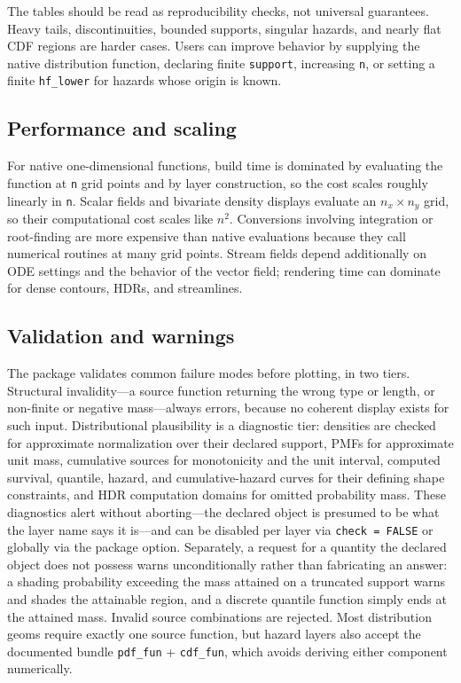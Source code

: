 The tables should be read as reproducibility checks, not universal guarantees.
Heavy tails, discontinuities, bounded supports, singular hazards, and nearly
flat CDF regions are harder cases. Users can improve behavior by supplying the
native distribution function, declaring finite \texttt{support}, increasing
\texttt{n}, or setting a finite \texttt{hf\_lower} for hazards whose origin is known.

\subsection{Performance and scaling}\label{performance-and-scaling}

For native one-dimensional functions, build time is dominated by evaluating the
function at \texttt{n} grid points and by  layer construction, so
the cost scales roughly linearly in \texttt{n}. Scalar fields and bivariate
density displays evaluate an \(n_x \times n_y\) grid, so their computational cost
scales like \(n^2\). Conversions involving integration or root-finding are more
expensive than native evaluations because they call numerical routines at many
grid points. Stream fields depend additionally on ODE settings and the behavior
of the vector field; rendering time can dominate for dense contours, HDRs, and
streamlines.

\subsection{Validation and warnings}\label{validation-and-warnings}

The package validates common failure modes before plotting, in two tiers.
Structural invalidity---a source function returning the wrong type or
length, or non-finite or negative mass---always errors, because no coherent
display exists for such input. Distributional plausibility is a diagnostic
tier: densities are checked for approximate normalization over their
declared support, PMFs for approximate unit mass, cumulative sources for
monotonicity and the unit interval, computed survival, quantile, hazard, and
cumulative-hazard curves for their defining shape constraints, and HDR
computation domains for omitted probability mass. These diagnostics alert
without aborting---the declared object is presumed to be what the layer name
says it is---and can be disabled per layer via \texttt{check\ =\ FALSE} or globally
via the package option. Separately, a request for a quantity the declared
object does not possess warns unconditionally rather than fabricating an
answer: a shading probability exceeding the mass attained on a truncated
support warns and shades the attainable region, and a discrete quantile
function simply ends at the attained mass. Invalid source combinations are
rejected. Most distribution geoms require
exactly one source function, but hazard layers also accept the documented
bundle \texttt{pdf\_fun} + \texttt{cdf\_fun}, which avoids deriving either component
numerically.

